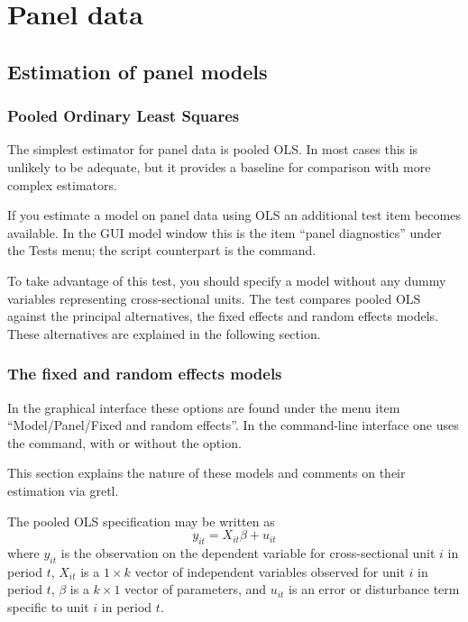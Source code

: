 \chapter{Panel data}
\label{chap-panel}

\section{Estimation of panel models}

\subsection{Pooled Ordinary Least Squares}
\label{pooled-est}

The simplest estimator for panel data is pooled OLS.  In most cases
this is unlikely to be adequate, but it provides a baseline for
comparison with more complex estimators.

If you estimate a model on panel data using OLS an additional test
item becomes available.  In the GUI model window this is the item
``panel diagnostics'' under the \textsf{Tests} menu; the script
counterpart is the  command.

To take advantage of this test, you should specify a model without any
dummy variables representing cross-sectional units.  The test compares
pooled OLS against the principal alternatives, the fixed effects and
random effects models.  These alternatives are explained in the
following section.

\subsection{The fixed and random effects models}
\label{sec:FE-vs-RE}

In the graphical interface these options are found under the menu item
``Model/Panel/Fixed and random effects''.  In the command-line
interface one uses the  command, with or without the
 option.

This section explains the nature of these models and comments on their
estimation via gretl.

The pooled OLS specification may be written as 
\begin{equation}
\label{eq:pooled}
y_{it} = X_{it}\beta + u_{it}
\end{equation}
where $y_{it}$ is the observation on the dependent variable for
cross-sectional unit $i$ in period $t$, $X_{it}$ is a $1\times k$
vector of independent variables observed for unit $i$ in period $t$,
$\beta$ is a $k\times 1$ vector of parameters, and $u_{it}$ is an error
or disturbance term specific to unit $i$ in period $t$.

